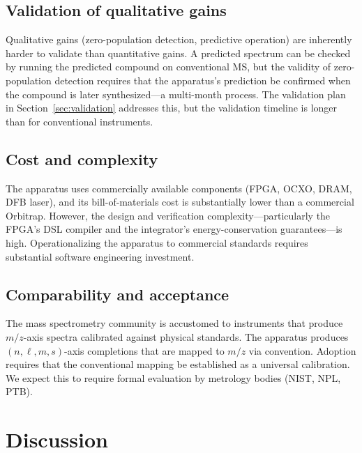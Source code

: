 \documentclass[twocolumn,11pt,a4paper]{article}
\theoremstyle{definition}
\theoremstyle{remark}
\begin{document}
\subsection{Validation of qualitative gains}

Qualitative gains (zero-population detection, predictive operation) are inherently harder to validate than quantitative gains. A predicted spectrum can be checked by running the predicted compound on conventional MS, but the validity of zero-population detection requires that the apparatus's prediction be confirmed when the compound is later synthesized---a multi-month process. The validation plan in Section~\ref{sec:validation} addresses this, but the validation timeline is longer than for conventional instruments.

\subsection{Cost and complexity}

The apparatus uses commercially available components (FPGA, OCXO, DRAM, DFB laser), and its bill-of-materials cost is substantially lower than a commercial Orbitrap. However, the design and verification complexity---particularly the FPGA's DSL compiler and the integrator's energy-conservation guarantees---is high. Operationalizing the apparatus to commercial standards requires substantial software engineering investment.

\subsection{Comparability and acceptance}

The mass spectrometry community is accustomed to instruments that produce $m/z$-axis spectra calibrated against physical standards. The apparatus produces $(n, \ell, m, s)$-axis completions that are mapped to $m/z$ via convention. Adoption requires that the conventional mapping be established as a universal calibration. We expect this to require formal evaluation by metrology bodies (NIST, NPL, PTB).

\section{Discussion}
\label{sec:discussion}
\end{document}

